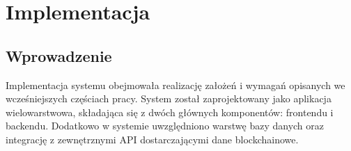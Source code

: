 \chapter{Implementacja}

\section{Wprowadzenie}

Implementacja systemu obejmowała realizację założeń i wymagań opisanych we wcześniejszych częściach pracy. System został zaprojektowany jako aplikacja wielowarstwowa, składająca się z dwóch głównych komponentów: frontendu i backendu. Dodatkowo w systemie uwzględniono warstwę bazy danych oraz integrację z zewnętrznymi API dostarczającymi dane blockchainowe.

